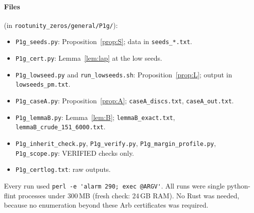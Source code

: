\documentclass[11pt]{article}
\theoremstyle{definition}\newtheorem{definition}[theorem]{Definition}
\theoremstyle{remark}\newtheorem{remark}[theorem]{Remark}
\begin{document}
\paragraph{Files} (in \texttt{rootunity\_zeros/general/P1g/}):
\begin{itemize}
\item \texttt{P1g\_seeds.py}: Proposition~\ref{prop:S}; data in \texttt{seeds\_*.txt}.
\item \texttt{P1g\_cert.py}: Lemma~\ref{lem:lap} at the low seeds.
\item \texttt{P1g\_lowseed.py} and \texttt{run\_lowseeds.sh}: Proposition~\ref{prop:L}; output in \texttt{lowseeds\_pm.txt}.
\item \texttt{P1g\_caseA.py}: Proposition~\ref{prop:A}; \texttt{caseA\_discs.txt}, \texttt{caseA\_out.txt}.
\item \texttt{P1g\_lemmaB.py}: Lemma~\ref{lem:B}; \texttt{lemmaB\_exact.txt}, \texttt{lemmaB\_crude\_151\_6000.txt}.
\item \texttt{P1g\_inherit\_check.py}, \texttt{P1g\_verify.py}, \texttt{P1g\_margin\_profile.py}, \texttt{P1g\_scope.py}: VERIFIED checks only.
\item \texttt{P1g\_certlog.txt}: raw outputs.
\end{itemize}
Every run used \verb|perl -e 'alarm 290; exec @ARGV'|. All runs were single python-flint processes under 300\,MB (fresh check: 24\,GB RAM). No Rust was needed, because no enumeration beyond these Arb certificates was required.
\end{document}
